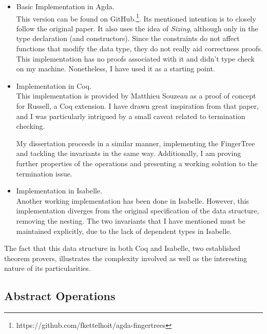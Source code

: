 \documentclass[12pt,twoside,notitlepage]{report}
\begin{document}
\begin{itemize}
\item Basic Implementation in Agda. \\
This version can be found on GitHub.\footnote{https://github.com/fkettelhoit/agda-fingertrees}. Its mentioned intention is to closely follow the original paper. It also uses  the idea of \textit{Sizing}, although only in the type declaration (and constructors). Since the constraints do not affect functions that modify the data type, they do not really aid correctness proofs. This implementation has no proofs associated with it and didn't type check on my machine. Nonetheless, I have used it as a starting point.
\item Implementation in Coq. \\
This implementation is provided by Matthieu Souzeau\cite{coq} as a proof of concept for Russell, a Coq extension. I have drawn great inspiration from that paper, and I was particularly intrigued by a small caveat related to termination checking.

My dissertation proceeds in a similar manner, implementing the FingerTree and tackling the invariants in the same way. Additionally, I am proving further properties of the operations and presenting a working solution to the termination issue.

\item Implementation in Isabelle. \\
Another working implementation has been done in Isabelle\cite{isabelle}. However, this implementation diverges from the original specification of the data structure, removing the nesting. The two invariants that I have mentioned must be maintained explicitly, due to the lack of dependent types in Isabelle.\\ 
\end{itemize}

The fact that this data structure in both Coq and Isabelle, two established theorem provers, illustrates the complexity involved as well as the interesting nature of its particularities.

\subsection{Abstract Operations}
\end{document}
